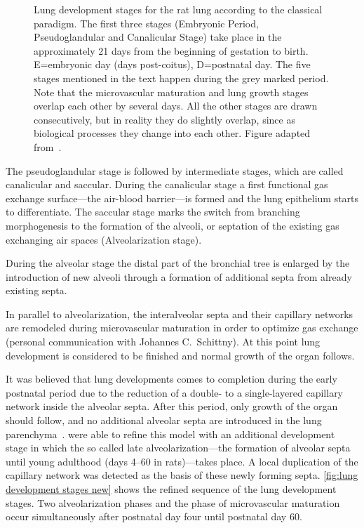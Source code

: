 \begin{figure}[htb]
	\noindent\makebox[\textwidth]{%
		\centering%
		}%
	\caption[Lung development stages, classical paradigm]{Lung development stages for the rat lung according to the classical paradigm. The first three stages (Embryonic Period, Pseudoglandular and Canalicular Stage) take place in the approximately 21 days from the beginning of gestation to birth. E=embryonic day (days post-coitus), D=postnatal day. The five stages mentioned in the text happen during the grey marked period. Note that the microvascular maturation and lung growth stages overlap each other by several days. All the other stages are drawn consecutively, but in reality they do slightly overlap, since as biological processes they change into each other. Figure adapted from~\cite{Schittny2007a}.}
	\label{fig:lung development stages old}
\end{figure}

The pseudoglandular stage is followed by intermediate stages, which are called canalicular and saccular. During the canalicular stage a first functional gas exchange surface---the air-blood barrier---is formed and the lung epithelium starts to differentiate. The saccular stage marks the switch from branching morphogenesis to the formation of the alveoli, or septation of the existing gas exchanging air spaces (Alveolarization stage).

During the alveolar stage the distal part of the bronchial tree is enlarged by the introduction of new alveoli through a formation of additional septa from already existing septa. 

In parallel to alveolarization, the interalveolar septa and their capillary networks are remodeled during microvascular maturation in order to optimize gas exchange (personal communication with Johannes C.\ Schittny). At this point lung development is considered to be finished and normal growth of the organ follows.

It was believed that lung developments comes to completion during the early postnatal period due to the reduction of a double- to a single-layered capillary network inside the alveolar septa. After this period, only growth of the organ should follow, and no additional alveolar septa are introduced in the lung parenchyma~\cite{Burri1999,Schittny2004}. \citet{Schittny2008} were able to refine this model with an additional development stage in which the so called late alveolarization---the formation of alveolar septa until young adulthood (days 4--60 in rats)---takes place. A local duplication of the capillary network was detected as the basis of these newly forming septa. \autoref{fig:lung development stages new} shows the refined sequence of the lung development stages. Two alveolarization phases and the phase of microvascular maturation occur simultaneously after postnatal day four until postnatal day 60.

